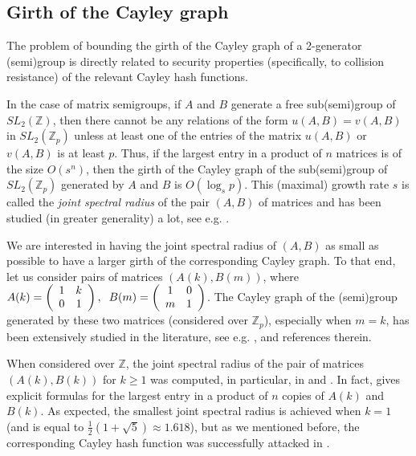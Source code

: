 \documentclass{lmsedition}
\newcommand{\Z}{\mathbb{Z}}
\begin{document}
\begin{twoblock}
 




\section*{Girth of the Cayley graph}\label{growth}


The problem of bounding the girth of the Cayley graph of a 2-generator (semi)group is directly related to security properties (specifically, to collision resistance) of the relevant Cayley hash functions. 

In the case of matrix semigroups, if $A$ and $B$ generate a free sub(semi)group of $SL_2(\Z)$, then there cannot be any relations of the form $u(A, B)=v(A, B)$ in $SL_2(\Z_p)$ unless at least one of the entries of the matrix $u(A, B)$ or $v(A, B)$ is at least $p$. Thus, if the largest entry in a product of $n$ matrices is of the size $O(s^n)$, then the girth of the Cayley graph of the  sub(semi)group of $SL_2(\Z_p)$ generated by $A$ and $B$ is $O(\log_s p)$.
This (maximal) growth rate $s$ is called the {\it joint spectral radius} of the pair $(A, B)$ of matrices and has been studied (in greater generality) a lot, see e.g. \cite{Jungers}.

We are interested in having the joint spectral radius of $(A, B)$ as small as possible to have a larger girth of the corresponding Cayley graph. To that end, let us consider pairs of matrices $(A(k), B(m))$, where $A(k) = \left(
 \begin{array}{cc} 1 & k \\ 0 & 1 \end{array} \right) , \hskip .2cm B(m) = \left(
 \begin{array}{cc} 1 & 0 \\ m & 1 \end{array} \right)$. The Cayley graph of the (semi)group generated by these two matrices (considered over $\Z_p$), especially when $m=k$, has been extensively studied in the literature, see e.g. \cite{BG}, \cite{H} and references therein. 

When considered over $\Z$, the joint spectral radius of the pair of matrices $(A(k), B(k))$ for $k \ge 1$ was computed, in particular, in \cite{BSV} and \cite{Masuda}. In fact, \cite{BSV} gives explicit formulas for the largest entry in a product of $n$ copies of $A(k)$ and $B(k)$. 
As expected, the smallest joint spectral radius is achieved when $k=1$ (and is equal to $\frac{1}{2}(1+\sqrt{5}) \approx 1.618$), but as we mentioned before, the corresponding Cayley hash function was successfully attacked in \cite{TZ_attack}. 


\end{twoblock}
\end{document}
